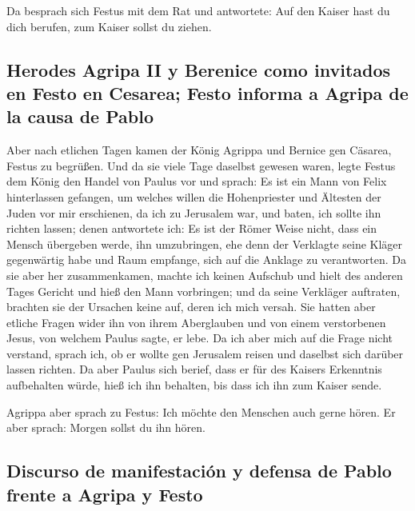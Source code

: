  Da besprach sich Festus mit dem Rat und antwortete: Auf
den Kaiser hast du dich berufen, zum Kaiser sollst du ziehen.

\hypertarget{herodes-agripa-ii-y-berenice-como-invitados-en-festo-en-cesarea-festo-informa-a-agripa-de-la-causa-de-pablo}{%
\subsection{Herodes Agripa II y Berenice como invitados en Festo en
Cesarea; Festo informa a Agripa de la causa de
Pablo}\label{herodes-agripa-ii-y-berenice-como-invitados-en-festo-en-cesarea-festo-informa-a-agripa-de-la-causa-de-pablo}}

 Aber nach etlichen Tagen kamen der König Agrippa und
Bernice gen Cäsarea, Festus zu begrüßen.  Und da sie
viele Tage daselbst gewesen waren, legte Festus dem König den Handel von
Paulus vor und sprach: Es ist ein Mann von Felix hinterlassen gefangen,
 um welches willen die Hohenpriester und Ältesten der
Juden vor mir erschienen, da ich zu Jerusalem war, und baten, ich sollte
ihn richten lassen;  denen antwortete ich: Es ist der
Römer Weise nicht, dass ein Mensch übergeben werde, ihn umzubringen, ehe
denn der Verklagte seine Kläger gegenwärtig habe und Raum empfange, sich
auf die Anklage zu verantworten.  Da sie aber her
zusammenkamen, machte ich keinen Aufschub und hielt des anderen Tages
Gericht und hieß den Mann vorbringen;  und da seine
Verkläger auftraten, brachten sie der Ursachen keine auf, deren ich mich
versah.  Sie hatten aber etliche Fragen wider ihn von
ihrem Aberglauben und von einem verstorbenen Jesus, von welchem Paulus
sagte, er lebe.  Da ich aber mich auf die Frage nicht
verstand, sprach ich, ob er wollte gen Jerusalem reisen und daselbst
sich darüber lassen richten.  Da aber Paulus sich berief,
dass er für des Kaisers Erkenntnis aufbehalten würde, hieß ich ihn
behalten, bis dass ich ihn zum Kaiser sende.

 Agrippa aber sprach zu Festus: Ich möchte den Menschen
auch gerne hören. Er aber sprach: Morgen sollst du ihn hören.

\hypertarget{discurso-de-manifestaciuxf3n-y-defensa-de-pablo-frente-a-agripa-y-festo}{%
\subsection{Discurso de manifestación y defensa de Pablo frente a Agripa
y
Festo}\label{discurso-de-manifestaciuxf3n-y-defensa-de-pablo-frente-a-agripa-y-festo}}

